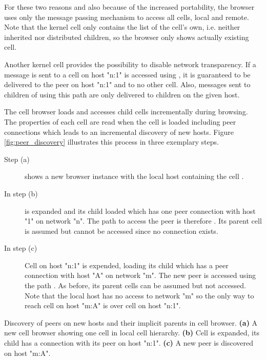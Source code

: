 For these two reasons and also because of the increased portability, the browser uses only the message passing mechanism to access all cells, local and remote. Note that the kernel cell  only contains the list of the cell's own, i.e. neither inherited nor distributed children, so the browser only shows actually existing cell.

Another kernel cell  provides the possibility to disable network transparency. If a message is sent to a cell  on host "n:1" is accessed using , it is guaranteed to be delivered to the peer on host "n:1" and to no other cell. Also, messages sent to children of  using this path are only delivered to children on the given host.

The cell browser loads and accesses child cells incrementally during browsing. The properties of each cell are read when the cell is loaded including peer connections which leads to an incremental discovery of new hosts. Figure \ref{fig:peer_discovery} illustrates this process in three exemplary steps. 

\begin{description}
\item[Step (a)]{shows a new browser instance with the local host containing the cell .}

\item[In step (b)]{ is expanded and its child  loaded which has one peer connection with host "1" on network "n". The path to access the peer is therefore . Its parent cell  is assumed but cannot be accessed since no connection exists.}

\item[In step (c)]{Cell  on host "n:1" is expended, loading its child  which has a peer connection with host "A" on network "m". The new peer is accessed using the path . As before, its parent cells can be assumed but not accessed. Note that the local host has no access to network "m" so the only way to reach cell  on host "m:A" is over cell  on host "n:1".}

\end{description}

{Discovery of peers on new hosts and their implicit parents in cell browser. \textbf{(a)} A new cell browser showing one cell in local cell hierarchy. \textbf{(b)} Cell  is expanded, its child  has a connection with its peer on host "n:1". \textbf{(c)} A new peer is discovered on host "m:A".}
